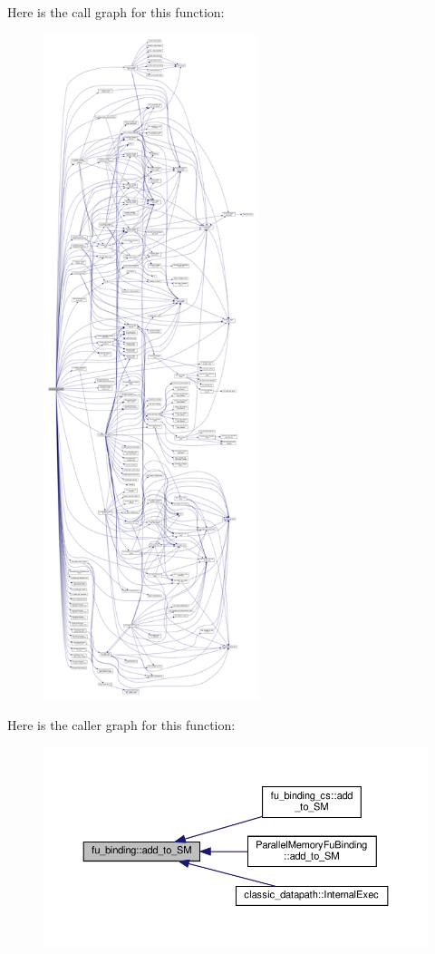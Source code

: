 Here is the call graph for this function\+:
\nopagebreak
\begin{figure}[H]
\begin{center}
\leavevmode
\includegraphics[height=550pt]{d8/d04/classfu__binding_a1485a3490fff093e44664db54ecdf39a_cgraph}
\end{center}
\end{figure}
Here is the caller graph for this function\+:
\nopagebreak
\begin{figure}[H]
\begin{center}
\leavevmode
\includegraphics[width=350pt]{d8/d04/classfu__binding_a1485a3490fff093e44664db54ecdf39a_icgraph}
\end{center}
\end{figure}
\mbox{\label{classfu__binding_af75163b4c31b19bb12cc240464978692}} 
